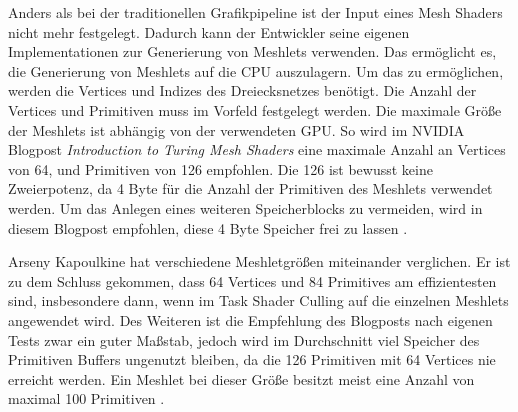 Anders als bei der traditionellen Grafikpipeline ist der Input eines Mesh Shaders nicht mehr festgelegt.
Dadurch kann der Entwickler seine eigenen Implementationen zur Generierung von Meshlets verwenden.
Das ermöglicht es, die Generierung von Meshlets auf die CPU auszulagern.
Um das zu ermöglichen, werden die Vertices und Indizes des Dreiecksnetzes benötigt.
Die Anzahl der Vertices und Primitiven muss im Vorfeld festgelegt werden.
Die maximale Größe der Meshlets ist abhängig von der verwendeten GPU.
So wird im NVIDIA Blogpost \textit{Introduction to Turing Mesh Shaders} eine maximale Anzahl an Vertices von 64, und Primitiven von 126 empfohlen.
Die 126 ist bewusst keine Zweierpotenz, da 4 Byte für die Anzahl der Primitiven des Meshlets verwendet werden.
Um das Anlegen eines weiteren Speicherblocks zu vermeiden, wird in diesem Blogpost empfohlen, diese 4 Byte Speicher frei zu lassen \cite{Kubisch2018}. \newline

Arseny Kapoulkine hat verschiedene Meshletgrößen miteinander verglichen.
Er ist zu dem Schluss gekommen, dass 64 Vertices und 84 Primitives am effizientesten sind, insbesondere dann, wenn im Task Shader Culling auf die einzelnen Meshlets angewendet wird.
Des Weiteren ist die Empfehlung des Blogposts nach eigenen Tests zwar ein guter Maßstab, jedoch wird im Durchschnitt viel Speicher des Primitiven Buffers ungenutzt bleiben, da die 126 Primitiven mit 64 Vertices nie erreicht werden.
Ein Meshlet bei dieser Größe besitzt meist eine Anzahl von maximal 100 Primitiven \cite{Kapoulkine2023}.

